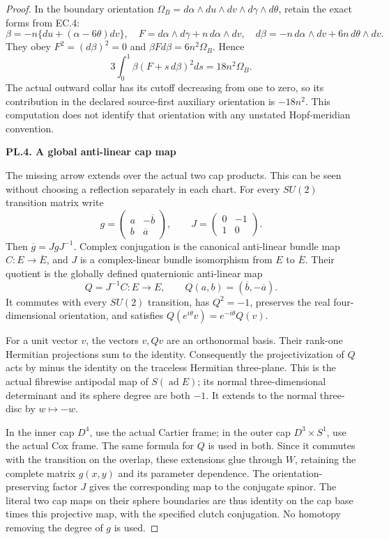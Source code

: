 \begin{proof}
In the boundary orientation
\(\Omega_B=d\alpha\wedge du\wedge dv\wedge d\gamma\wedge d\theta\),
retain the exact forms from EC.4:
\[
 \beta=-n\{du+(\alpha-6\theta)dv\},\quad
 F=d\alpha\wedge d\gamma+n\,d\alpha\wedge dv,
 \quad d\beta=-n\,d\alpha\wedge dv+6n\,d\theta\wedge dv.
\]
They obey \(F^2=(d\beta)^2=0\) and
\(\beta Fd\beta=6n^2\Omega_B\). Hence
\[
 3\int_0^1\beta(F+s\,d\beta)^2ds=18n^2\Omega_B.
\]
The actual outward collar has its cutoff decreasing from one to zero,
so its contribution in the declared source-first auxiliary orientation
is \(-18n^2\). This computation does not identify that orientation
with any unstated Hopf-meridian convention.

\par

\medskip\noindent\textbf{PL.4. A global anti-linear cap map}

\par\nopagebreak[4]

The missing arrow extends over the actual two cap products. This can
be seen without choosing a reflection separately in each chart. For
every \(SU(2)\) transition matrix write
\[
 g=\begin{pmatrix}a&-\overline b\\b&\overline a\end{pmatrix},
 \qquad J=\begin{pmatrix}0&-1\\1&0\end{pmatrix}.
\]
Then \(\overline g=JgJ^{-1}\). Complex conjugation is the canonical
anti-linear bundle map \(C:E\longrightarrow\overline E\), and \(J\)
is a complex-linear bundle isomorphism from \(E\) to \(\overline E\).
Their quotient is the globally defined quaternionic anti-linear map
\[
 Q=J^{-1}C:E\longrightarrow E,
 \qquad Q(a,b)=(\overline b,-\overline a).
\]
It commutes with every \(SU(2)\) transition, has \(Q^2=-1\), preserves
the real four-dimensional orientation, and satisfies
\(Q(e^{i\theta}v)=e^{-i\theta}Q(v)\).

For a unit vector \(v\), the vectors \(v,Qv\) are an orthonormal
basis. Their rank-one Hermitian projections sum to the identity.
Consequently the projectivization of \(Q\) acts by minus the identity
on the traceless Hermitian three-plane. This is the actual fibrewise
antipodal map of \(S(\operatorname{ad}E)\); its normal three-dimensional
determinant and its sphere degree are both \(-1\). It extends to the
normal three-disc by \(w\mapsto-w\).

In the inner cap \(D^4\), use the actual Cartier frame; in the outer
cap \(D^3\times S^1\), use the actual Cox frame. The same formula for
\(Q\) is used in both. Since it commutes with the transition on the
overlap, these extensions glue through \(W\), retaining the complete
matrix \(g(x,y)\) and its parameter dependence. The orientation-
preserving factor \(J\) gives the corresponding map to the conjugate
spinor. The literal two cap maps on their sphere boundaries are thus
identity on the cap base times this projective map, with the specified
clutch conjugation. No homotopy removing the degree of \(g\) is used.


\end{proof}
